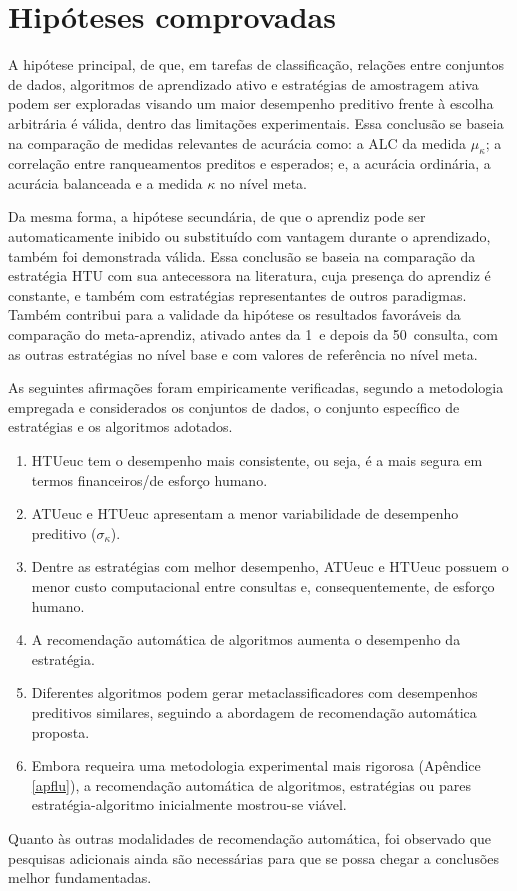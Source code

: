 \section{Hipóteses comprovadas}\label{conchipoteses}

A hipótese principal, de que, em tarefas de classificação, relações entre conjuntos de dados, algoritmos de aprendizado ativo e estratégias de amostragem ativa podem ser exploradas visando um maior desempenho preditivo frente à escolha arbitrária é válida, dentro das limitações experimentais.
Essa conclusão se baseia na comparação de medidas relevantes de acurácia como: a ALC da medida $\mu_\kappa$; a correlação entre ranqueamentos preditos e esperados; e, a acurácia ordinária, a acurácia balanceada e a medida $\kappa$ no nível meta.

Da mesma forma, a hipótese secundária, de que o aprendiz pode ser automaticamente inibido ou substituído com vantagem durante o aprendizado, também foi demonstrada válida.
Essa conclusão se baseia na comparação da estratégia HTU com sua antecessora na literatura, cuja presença do aprendiz é constante, e também com estratégias representantes de outros paradigmas.
Também contribui para a validade da hipótese os resultados favoráveis da comparação do meta-aprendiz, ativado antes da 1\textordfeminine~e depois da 50\textordfeminine~consulta, com as outras estratégias no nível base e com valores de referência no nível meta.

As seguintes afirmações foram empiricamente verificadas, segundo a metodologia empregada e considerados os conjuntos de dados, o conjunto específico de estratégias e os algoritmos adotados.
\begin{enumerate}
\item HTUeuc tem o desempenho mais consistente, ou seja, é a mais segura em termos financeiros/de esforço humano.
\item ATUeuc e HTUeuc apresentam a menor variabilidade de desempenho preditivo ($\sigma_\kappa$).
\item Dentre as estratégias com melhor desempenho, ATUeuc e HTUeuc possuem o menor custo computacional entre consultas e, consequentemente, de esforço humano.
\item A recomendação automática de algoritmos aumenta o desempenho da estratégia.
\item Diferentes algoritmos podem gerar metaclassificadores com desempenhos preditivos similares, seguindo a abordagem de recomendação automática proposta.
\item Embora requeira uma metodologia experimental mais rigorosa (Apêndice \ref{apflu}), a recomendação automática de algoritmos, estratégias ou pares estratégia-algoritmo inicialmente mostrou-se viável.
\end{enumerate}
Quanto às outras modalidades de recomendação automática, foi observado que pesquisas adicionais ainda são necessárias para que se possa chegar a conclusões melhor fundamentadas.

